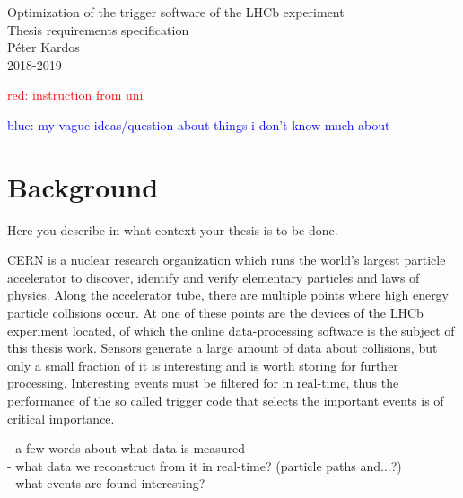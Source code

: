 \documentclass[12pt]{article}
\begin{document}
	
	
	\begin{center}
		\Huge Optimization of the trigger software of the LHCb experiment\\		
		\Large Thesis requirements specification\\
		\vspace{1pc}
		\huge Péter Kardos \\
		\large 2018-2019
	\end{center}
	\vspace{.5pc}
	
	
	\textcolor{red}{red: instruction from uni}
	
	\textcolor{blue}{blue: my vague ideas/question about things i don't know much about}
	
	
	\section{Background}
	
	\color{red}
	Here you describe in what context your thesis is to be done.
	\color{black}
	
	CERN is a nuclear research organization which runs the world's largest particle accelerator to discover, identify and verify elementary particles and laws of physics. Along the accelerator tube, there are multiple points where high energy particle collisions occur. At one of these points are the devices of the LHCb experiment located, of which the online data-processing software is the subject of this thesis work. Sensors generate a large amount of data about collisions, but only a small fraction of it is interesting and is worth storing for further processing. Interesting events must be filtered for in real-time, thus the performance of the so called trigger code that selects the important events is of critical importance.
	
	\vspace{1pc}
	\color{blue}
	- a few words about what data is measured \\
	- what data we reconstruct from it in real-time? (particle paths and...?)\\
	- what events are found interesting?
\end{document}
